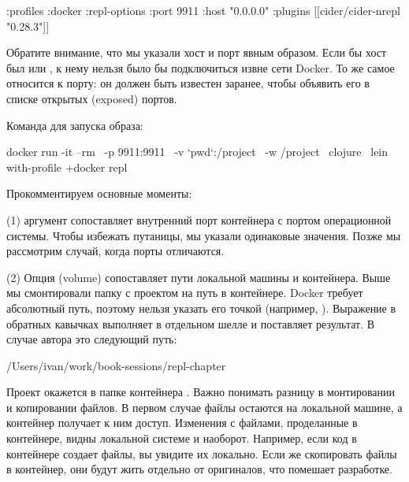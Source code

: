 \begin{english}
  \begin{clojure}
:profiles
{:docker
 {:repl-options {:port 9911
                 :host "0.0.0.0"}
  :plugins [[cider/cider-nrepl "0.28.3"]]}}
  \end{clojure}
\end{english}

Обратите внимание, что мы указали хост и порт явным образом. Если бы хост был  или , к нему нельзя было бы подключиться извне сети Docker. То же самое относится к порту: он должен быть известен заранее, чтобы объявить его в списке открытых (exposed) портов.

Команда для запуска образа:

\begin{english}
  \begin{bash}
docker run -it --rm \
  -p 9911:9911 \
  -v `pwd`:/project \
  -w /project \
  clojure \
  lein with-profile +docker repl
  \end{bash}
\end{english}

Прокомментируем основные моменты:

(1) аргумент  сопоставляет внутренний порт контейнера с портом операционной системы. Чтобы избежать путаницы, мы указали одинаковые значения. Позже мы рассмотрим случай, когда порты отличаются.

(2) Опция  (volume) сопоставляет пути локальной машины и контейнера. Выше мы смонтировали папку с проектом на путь  в контейнере. Docker требует абсолютный путь, поэтому нельзя указать его точкой (например, ). Выражение  в обратных кавычках выполняет  в отдельном шелле и поставляет результат. В случае автора это следующий путь:

\begin{english}
  \begin{text}
/Users/ivan/work/book-sessions/repl-chapter
  \end{text}
\end{english}

Проект окажется в папке контейнера . Важно понимать разницу в монтировании и копировании файлов. В первом случае файлы остаются на локальной машине, а контейнер получает к ним доступ. Изменения с файлами, проделанные в контейнере, видны локальной системе и наоборот. Например, если код в контейнере создает файлы, вы увидите их локально. Если же скопировать файлы в контейнер, они будут жить отдельно от оригиналов, что помешает разработке.

